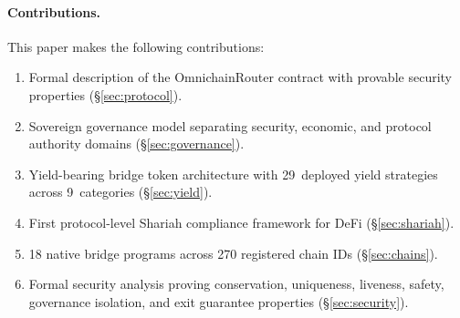\paragraph{Contributions.} This paper makes the following contributions:
\begin{enumerate}[nosep]
  \item Formal description of the OmnichainRouter contract with provable security properties (\S\ref{sec:protocol}).
  \item Sovereign governance model separating security, economic, and protocol authority domains (\S\ref{sec:governance}).
  \item Yield-bearing bridge token architecture with 29~deployed yield strategies across 9~categories (\S\ref{sec:yield}).
  \item First protocol-level Shariah compliance framework for DeFi (\S\ref{sec:shariah}).
  \item 18 native bridge programs across 270 registered chain IDs (\S\ref{sec:chains}).
  \item Formal security analysis proving conservation, uniqueness, liveness, safety, governance isolation, and exit guarantee properties (\S\ref{sec:security}).
\end{enumerate}

